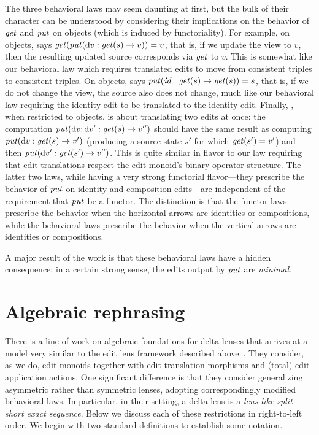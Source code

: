 The three behavioral laws may seem daunting at first, but the bulk of their
character can be understood by considering their implications on the
behavior of $\mathit{get}$ and $\mathit{put}$ on objects (which is induced by
functoriality). For example, on objects,  says
$\mathit{get}(\mathit{put}(\textrm{d} v : \mathit{get}(s) \to v))=v$, that is, if we update the view to $v$,
then the resulting updated source corresponds via $\mathit{get}$ to $v$. This is
somewhat like our behavioral law which requires translated edits to move
from consistent triples to consistent triples. On objects,  says
$\mathit{put}(\mathit{id} : \mathit{get}(s) \to \mathit{get}(s)) = s$, that is, if we do not change the
view, the source also does not change, much like our behavioral law
requiring the identity edit to be translated to the identity edit. Finally,
, when restricted to objects, is about translating two edits at
once: the computation $\mathit{put}(\textrm{d} v;\textrm{d} v' : \mathit{get}(s) \to v'')$ should have the same
result as computing $\mathit{put}(\textrm{d} v : \mathit{get}(s) \to v')$ (producing a source state
$s'$ for which $\mathit{get}(s')=v'$) and then $\mathit{put}(\textrm{d} v' : \mathit{get}(s') \to v'')$. This is
quite similar in flavor to our law requiring that edit translations respect
the edit monoid's binary operator structure. The latter two laws, while
having a very strong functorial flavor---they prescribe the behavior of
$\mathit{put}$ on identity and composition edits---are independent of the
requirement that $\mathit{put}$ be a functor. The distinction is that the functor
laws prescribe the behavior when the horizontal arrows are identities or
compositions, while the behavioral laws prescribe the behavior when the
vertical arrows are identities or compositions.

A major result of the work is that these behavioral laws have a hidden
consequence: in a certain strong sense, the edits output by $\mathit{put}$ are
\emph{minimal}.

\section{Algebraic rephrasing}
\label{sec:algebraic}
There is a line of work on algebraic foundations for delta lenses that
arrives at a model very similar to the edit lens framework described
above~\cite{stevens2008tat}. They consider, as we do, edit monoids together
with edit translation morphisms and (total) edit application actions.
One significant difference is that they consider generalizing asymmetric
rather than symmetric lenses, adopting correspondingly modified behavioral
laws. In particular, in their setting, a delta lens is a \emph{lens-like
split short exact sequence}. Below we discuss each of these restrictions in
right-to-left order. We begin with two standard definitions to establish
some notation.


